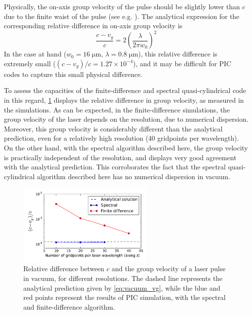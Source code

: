 \documentclass[1p,times,authoryear]{elsarticle}
\begin{document}
Physically, the on-axis group velocity of the pulse should be slightly lower than $c$ due
to the finite waist of the pulse (see e.g. \citep{Esarey1999}). The
analytical expression for the corresponding relative
difference in on-axis group velocity is
\begin{equation} 
\label{eq:vacuum_vg}
\frac{c-v_g}{c} = 2\left( \frac{\lambda}{2\pi w_0} \right)^2
\end{equation}
\noindent In the case at hand ($w_0=16\;\mathrm{\mu m}$,
$\lambda=0.8\;\mathrm{\mu m}$), this relative difference is extremely
small ($(c-v_g)/c = 1.27 \times 10^{-4}$), and it may be difficult for
PIC codes to capture this small physical difference. 

To assess the capacities of the finite-difference and
spectral quasi-cylindrical code in this regard, \cref{fig:Vacuum_vg} displays the relative
difference in group velocity, as measured in the
simulations. As can be expected, in the
finite-difference simulations, the
group velocity of the laser depends on the resolution, due to numerical
dispersion. 
Moreover, this group velocity is considerably different than the analytical
prediction, even for a relatively high resolution (40 gridpoints per
wavelength). On the other hand, with the spectral algorithm described
here, the group velocity is practically independent of the resolution, and
displays very good agreement with the analytical prediction. 
This corroborates the fact that the spectral quasi-cylindrical algorithm
described here has no numerical dispersion in vacuum.

\begin{figure}[!h]
\centering
\includegraphics[width=0.6\textwidth]{figures/Vacuum_vg.pdf}
\caption{\label{fig:Vacuum_vg}Relative difference between $c$ and the
group velocity of a laser pulse in vacuum, for different resolutions. The dashed line represents
the analytical prediction given by \cref{eq:vacuum_vg}, while the blue
and red points represent the results of PIC simulation, with the
spectral and finite-difference algorithm.}
\end{figure}
\end{document}
